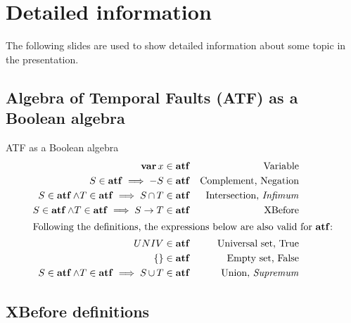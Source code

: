 \documentclass{beamer}
\def\ATF{%
	Algebra of Temporal Faults (ATF)%
	\gdef\ATF{ATF\xspace}%
	\gdef\iATF{an ATF\xspace}%
	\gdef\IATF{An ATF\xspace}%
	\xspace%
}
\def\iATF{%
	an Algebra of Temporal Faults (ATF)%
	\gdef\ATF{ATF\xspace}%
	\gdef\iATF{an ATF\xspace}%
	\gdef\IATF{An ATF\xspace}%
	\xspace%
}
\def\IATF{%
	An Algebra of Temporal Faults (ATF)%
	\gdef\ATF{ATF\xspace}%
	\gdef\iATF{an ATF\xspace}%
	\gdef\IATF{An ATF\xspace}%
	\xspace%
}
\def\varop{\ensuremath\operatorname{\mathbf{var}}}
\newcommand{\var}[1]{\ensuremath\varop #1}
\def\xbeforeop{\ensuremath\rightarrow}
\newcommand{\xbefore}[2]{\ensuremath #1 \xbeforeop #2 }
\def\union{\ensuremath\operatorname{\cup}}
\def\inter{\ensuremath\operatorname{\cap}}
\def\algebraset{\ensuremath\operatorname{\mathbf{atf}}}
\begin{document}
\begin{frame}[label=end]
\titlepage
\end{frame}

\section{Detailed information}

\begin{frame}[noframenumbering]
	The following slides are used to show detailed information about some topic in the presentation.
\end{frame}

\subsection{\ATF as a Boolean algebra}

\begin{frame}[noframenumbering,label=inductiveatf]{\ATF as a Boolean algebra}
	\begin{align*}
		\var x & \in \algebraset & \text{Variable}\\
		S \in \algebraset \implies -S & \in \algebraset & \text{Complement, Negation}\\
		S \in \algebraset \land T \in \algebraset \implies S \inter T & \in \algebraset & \text{Intersection, \emph{Infimum}}\\
		S \in \algebraset \land T \in \algebraset \implies \xbefore{S}{T} & \in \algebraset & \text{XBefore}\\
		\intertext{Following the definitions, the expressions below are also valid for $\algebraset$:}
		UNIV &\in \algebraset & \text{Universal set, True}\\
		\{\} &\in \algebraset & \text{Empty set, False}\\
		S \in \algebraset \land T \in \algebraset \implies S \union T &\in \algebraset & \text{Union, \emph{Supremum}}
	\end{align*}
	\hyperlink{thealgebra}{}
\end{frame}

\subsection{XBefore definitions}
\end{document}
